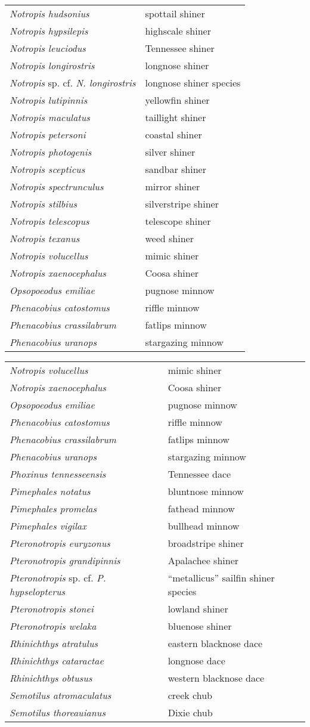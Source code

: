 \documentclass[11pt]{article}
\begin{document}
\begin{tabular}{@{}L{3in}L{3in}@{}}
\textit{Notropis hudsonius} &   spottail shiner\tabularnewline
\textit{Notropis hypsilepis} &   highscale shiner\tabularnewline
\textit{Notropis leuciodus} &   Tennessee shiner\tabularnewline
\textit{Notropis longirostris} &   longnose shiner\tabularnewline
\textit{Notropis} sp. cf. \textit{N. longirostris} &   longnose shiner species\tabularnewline
\textit{Notropis lutipinnis} &   yellowfin shiner\tabularnewline
\textit{Notropis maculatus} &   taillight shiner\tabularnewline
\textit{Notropis petersoni} &   coastal shiner\tabularnewline
\textit{Notropis photogenis} &   silver shiner\tabularnewline
\textit{Notropis scepticus} &   sandbar shiner\tabularnewline
\textit{Notropis spectrunculus} &   mirror shiner\tabularnewline
\textit{Notropis stilbius} &   silverstripe shiner\tabularnewline
\textit{Notropis telescopus} &   telescope shiner\tabularnewline
\textit{Notropis texanus} &   weed shiner\tabularnewline
\textit{Notropis volucellus} &   mimic shiner\tabularnewline
\textit{Notropis xaenocephalus} &   Coosa shiner\tabularnewline
\textit{Opsopoeodus emiliae} &   pugnose minnow\tabularnewline
\textit{Phenacobius catostomus} &   riffle minnow\tabularnewline
\textit{Phenacobius crassilabrum} &   fatlips minnow\tabularnewline
\textit{Phenacobius uranops} &   stargazing minnow\tabularnewline
\end{tabular}

\vspace{\baselineskip}

%
\textbf{\Student}

\begin{tabular}{@{}L{3in}L{3in}@{}}
\textit{Notropis volucellus} &   mimic shiner\tabularnewline
\textit{Notropis xaenocephalus} &   Coosa shiner\tabularnewline
\textit{Opsopoeodus emiliae} &   pugnose minnow\tabularnewline
\textit{Phenacobius catostomus} &   riffle minnow\tabularnewline
\textit{Phenacobius crassilabrum} &   fatlips minnow\tabularnewline
\textit{Phenacobius uranops} &   stargazing minnow\tabularnewline
\textit{Phoxinus tennesseensis} &   Tennessee dace\tabularnewline
\textit{Pimephales notatus} &   bluntnose minnow\tabularnewline
\textit{Pimephales promelas} &   fathead minnow\tabularnewline
\textit{Pimephales vigilax} &   bullhead minnow\tabularnewline
\textit{Pteronotropis euryzonus} &   broadstripe shiner\tabularnewline
\textit{Pteronotropis grandipinnis} &   Apalachee shiner\tabularnewline
\textit{Pteronotropis} sp. cf. \textit{P. hypselopterus} &   “metallicus” sailfin shiner species\tabularnewline
\textit{Pteronotropis stonei} &   lowland shiner\tabularnewline
\textit{Pteronotropis welaka} &   bluenose shiner\tabularnewline
\textit{Rhinichthys atratulus} &   eastern blacknose dace\tabularnewline
\textit{Rhinichthys cataractae} &   longnose dace\tabularnewline
\textit{Rhinichthys obtusus} &   western blacknose dace\tabularnewline
\textit{Semotilus atromaculatus} &   creek chub\tabularnewline
\textit{Semotilus thoreauianus} &   Dixie chub\tabularnewline
\end{tabular}
\end{document}

